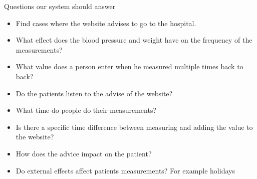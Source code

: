 Questions our system should answer

\begin{itemize}
\item Find cases where the website advises to go to the hospital.
\item What effect does the blood pressure and weight have on the frequency of the measurements?
\item What value does a person enter when he measured multiple times back to back?
\item Do the patients listen to the advise of the website?
\item What time do people do their measurements?
\item Is there a specific time difference between measuring and adding the value to the website?
\item How does the advice impact on the patient?
\item Do external effects affect patients measurements? For example holidays
\end{itemize}